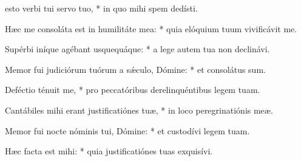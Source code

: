 \begin{psalmus}

 esto verbi tui servo tuo, * in quo mihi spem dedísti.

Hæc me consoláta est in humilitáte mea: * quia elóquium tuum vivificávit me.

Supérbi iníque agébant usquequáque: * a lege autem tua non declinávi.

Memor fui judiciórum tuórum a sǽculo, Dómine: * et consolátus sum.

Deféctio ténuit me, * pro peccatóribus derelinquéntibus legem tuam.

Cantábiles mihi erant justificatiónes tuæ, * in loco peregrinatiónis meæ.

Memor fui nocte nóminis tui, Dómine: * et custodívi legem tuam.

Hæc facta est mihi: * quia justificatiónes tuas exquisívi.

\end{psalmus}
